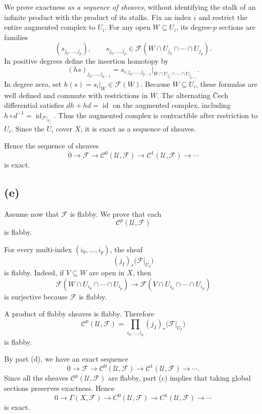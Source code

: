We prove exactness \emph{as a sequence of sheaves}, without identifying
the stalk of an infinite product with the product of its stalks.
Fix an index $i$ and restrict the entire augmented complex to $U_i$.
For any open $W\subseteq U_i$, its degree-$p$ sections are families
\[
(s_{j_0,\ldots,j_p}),\qquad
s_{j_0,\ldots,j_p}\in
\mathcal F(W\cap U_{j_0}\cap\cdots\cap U_{j_p}).
\]
In positive degrees define the insertion homotopy by
\[
(hs)_{j_0,\ldots,j_{p-1}}
= s_{i,j_0,\ldots,j_{p-1}}
\big|_{W\cap U_{j_0}\cap\cdots\cap U_{j_{p-1}}}.
\]
In degree zero, set $h(s)=s_i|_W\in\mathcal F(W)$.
Because $W\subseteq U_i$, these formulas are well defined and commute
with restrictions in $W$. The alternating \v{C}ech differential satisfies
$dh+hd=\operatorname{id}$ on the augmented complex, including
$h\circ d^{-1}=\operatorname{id}_{\mathcal F|_{U_i}}$.
Thus the augmented complex is contractible after restriction to $U_i$.
Since the $U_i$ cover $X$, it is exact as a sequence of sheaves.

Hence the sequence of sheaves
\[
0\longrightarrow \mathcal F
\longrightarrow
\mathcal C^0(\mathcal U,\mathcal F)
\longrightarrow
\mathcal C^1(\mathcal U,\mathcal F)
\longrightarrow
\cdots
\]
is exact.

\subsection*{(e)}

Assume now that $\mathcal F$ is flabby. We prove that each
\[
\mathcal C^p(\mathcal U,\mathcal F)
\]
is flabby.

For every multi-index $(i_0,\ldots,i_p)$, the sheaf
\[
(j_I)_*\bigl(\mathcal F|_{U_I}\bigr)
\]
is flabby. Indeed, if $V\subseteq W$ are open in $X$, then
\[
\mathcal F(W\cap U_{i_0}\cap\cdots\cap U_{i_p})
\longrightarrow
\mathcal F(V\cap U_{i_0}\cap\cdots\cap U_{i_p})
\]
is surjective because $\mathcal F$ is flabby.

A product of flabby sheaves is flabby. Therefore
\[
\mathcal C^p(\mathcal U,\mathcal F)
=
\prod_{i_0,\ldots,i_p}
(j_I)_*\bigl(\mathcal F|_{U_I}\bigr)
\]
is flabby.

By part (d), we have an exact sequence
\[
0\longrightarrow \mathcal F
\longrightarrow
\mathcal C^0(\mathcal U,\mathcal F)
\longrightarrow
\mathcal C^1(\mathcal U,\mathcal F)
\longrightarrow
\cdots.
\]
Since all the sheaves $\mathcal C^p(\mathcal U,\mathcal F)$ are flabby,
part (c) implies that taking global sections preserves exactness. Hence
\[
0\longrightarrow \Gamma(X,\mathcal F)
\longrightarrow C^0(\mathcal U,\mathcal F)
\longrightarrow C^1(\mathcal U,\mathcal F)
\longrightarrow \cdots
\]
is exact.

